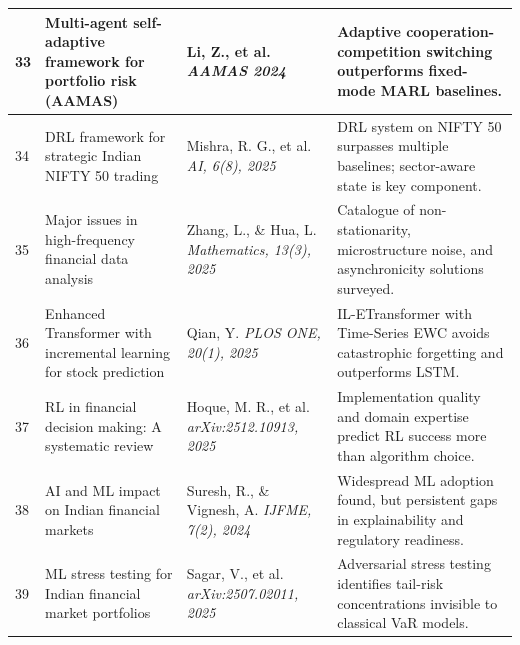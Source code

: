 \documentclass[12pt,a4paper,oneside]{report}
\theoremstyle{definition}
\theoremstyle{remark}
\begin{document}
\begin{center}
\begin{longtable}{|p{0.8cm}|p{4.2cm}|>{\raggedright\arraybackslash}p{4cm}|p{4.5cm}|}
33 & Multi-agent self-adaptive framework for portfolio risk (AAMAS) \cite{LiMASA2024AAMAS} & Li, Z., et al. \newline\newline \textit{AAMAS 2024} & Adaptive cooperation-competition switching outperforms fixed-mode MARL baselines. \\ \hline

34 & DRL framework for strategic Indian NIFTY 50 trading \cite{Mishra2025NiftyDRL} & Mishra, R. G., et al. \newline\newline \textit{AI, 6(8), 2025} & DRL system on NIFTY 50 surpasses multiple baselines; sector-aware state is key component. \\ \hline

35 & Major issues in high-frequency financial data analysis \cite{Zhang2025HFData} & Zhang, L., \& Hua, L. \newline\newline \textit{Mathematics, 13(3), 2025} & Catalogue of non-stationarity, microstructure noise, and asynchronicity solutions surveyed. \\ \hline

36 & Enhanced Transformer with incremental learning for stock prediction \cite{Qian2025ILTransformer} & Qian, Y. \newline\newline \textit{PLOS ONE, 20(1), 2025} & IL-ETransformer with Time-Series EWC avoids catastrophic forgetting and outperforms LSTM. \\ \hline

37 & RL in financial decision making: A systematic review \cite{Hoque2025RLFinanceReview} & Hoque, M. R., et al. \newline\newline \textit{arXiv:2512.10913, 2025} & Implementation quality and domain expertise predict RL success more than algorithm choice. \\ \hline

38 & AI and ML impact on Indian financial markets \cite{Suresh2024AIIndianFinance} & Suresh, R., \& Vignesh, A. \newline\newline \textit{IJFME, 7(2), 2024} & Widespread ML adoption found, but persistent gaps in explainability and regulatory readiness. \\ \hline

39 & ML stress testing for Indian financial market portfolios \cite{Sagar2025MLStressTesting} & Sagar, V., et al. \newline\newline \textit{arXiv:2507.02011, 2025} & Adversarial stress testing identifies tail-risk concentrations invisible to classical VaR models. \\ \hline


\end{longtable}
\end{center}
\end{document}
